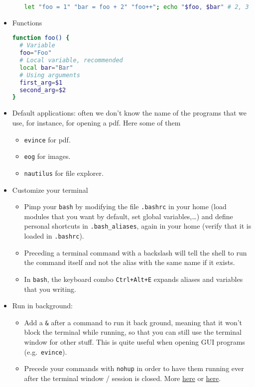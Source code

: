 \documentclass[a4paper,12pt,%
              final%
              ]{article}
\begin{document}
\begin{itemize}
\begin{itemize}
\begin{lstlisting}[language=bash]
let "foo = 1" "bar = foo + 2" "foo++"; echo "$foo, $bar" # 2, 3
\end{lstlisting}
    \end{itemize}
  \item Functions
\begin{lstlisting}[language=bash]
function foo() {
  # Variable
  foo="Foo"
  # Local variable, recommended
  local bar="Bar"
  # Using arguments
  first_arg=$1
  second_arg=$2
}
\end{lstlisting}
  \item Default applications: often we don't know the name of the programs that we use, for instance, for opening a pdf. Here some of them
    \begin{itemize}
      \item \texttt{evince} for pdf.
      \item \texttt{eog} for images.
      \item \texttt{nautilus} for file explorer.
    \end{itemize}
  \item Customize your terminal
    \begin{itemize}
      \item Pimp your \texttt{bash} by modifying the file \texttt{.bashrc} in your home (load modules that you want by default, set global variables,\ldots) and define personal shortcuts in \texttt{.bash\_aliases}, again in your home (verify that it is loaded in \texttt{.bashrc}).
      \item Preceding a terminal command with a backslash will tell the shell to run the command itself and not the alias with the same name if it exists.
      \item In \texttt{bash}, the keyboard combo \texttt{Ctrl+Alt+E} expands aliases and variables that you writing.
    \end{itemize}
  \item Run in background:
    \begin{itemize}
      \item Add a \verb|&| after a command to run it back ground, meaning that it won't block the terminal while running, so that you can still use the terminal window for other stuff. This is quite useful when opening GUI programs (e.g.\ \texttt{evince}).
      \item Precede your commands with \texttt{nohup} in order to have them running ever after the terminal window / session is closed. More \href{https://linux.101hacks.com/unix/nohup-command/}{here} or \href{https://hexadix.com/use-nohup-execute-commands-background-keep-running-exit-shell-promt/}{here}.

\end{itemize}
\end{itemize}
\end{document}
